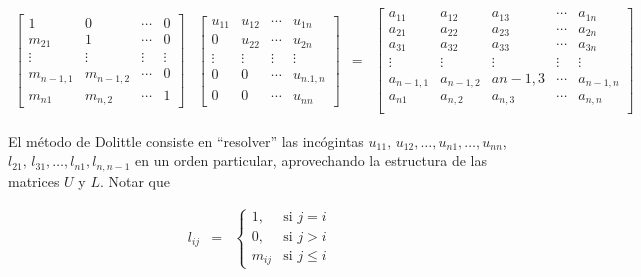 \documentclass[
]{article}
\begin{document}
\begin{equation}
\begin{array}{cccc}
   \begin{bmatrix} 
       1        &    0    & \cdots & 0   \\
       m_{21}   &    1    & \cdots & 0   \\
     \vdots     & \vdots  & \vdots & \vdots \\
     m_{n-1,1}     & m_{n-1,2} & \cdots & 0 \\
     m_{n1}     & m_{n,2} & \cdots & 1  
  \end{bmatrix} & 
  \begin{bmatrix} 
      u_{11}  &    u_{12}  & \cdots & u_{1n}   \\
       0      &    u_{22}  & \cdots & u_{2n}   \\
     \vdots   & \vdots     & \vdots & \vdots \\
       0      &  0         & \cdots & u_{n.1,n} \\
       0      &  0         & \cdots & u_{nn}  
  \end{bmatrix} &
  = 
  &
  \begin{bmatrix} 
     a_{11} & a_{12}      & a_{13}     & \cdots & a_{1n}       \\ 
     a_{21} & a_{22}      & a_{23}     & \cdots & a_{2n}       \\
     a_{31} & a_{32}      & a_{33}     & \cdots & a_{3n}       \\
    \vdots  & \vdots      & \vdots     & \vdots & \vdots       \\
     a_{n-1,1}& a_{n-1,2} & a{n-1,3}   & \cdots & a_{n-1,n}    \\
     a_{n1} & a_{n,2}     & a_{n,3}    & \cdots & a_{n,n}     \\
  \end{bmatrix}
\end{array}
\end{equation}

El método de Dolittle consiste en ``resolver'' las incógintas
\(u_{11},\,u_{12},\ldots,u_{n1},\ldots,u_{nn}\),
\(l_{21},\,l_{31},\ldots,l_{n1},l_{n,n-1}\) en un orden particular,
aprovechando la estructura de las matrices \(U\) y \(L\). Notar que

\begin{equation}
\begin{array}{ccc}
l_{ij} &  = &\begin{cases}
              1,        & \text{si $j=i$}\\
              0,        & \text{si $j>i$}\\
              m_{ij}    & \text{si $j \leq i$}
            \end{cases}
\end{array}
\end{equation}
\end{document}
